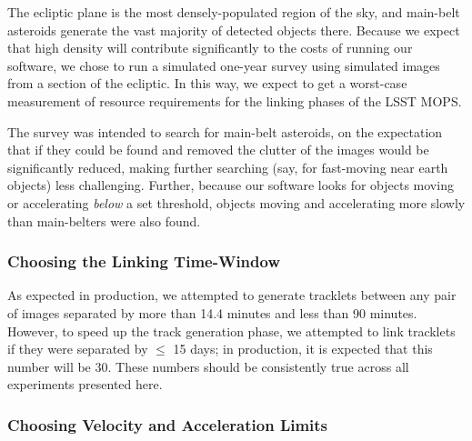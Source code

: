 \documentclass[12pt,preprint]{aastex}
\begin{document}
The ecliptic plane is the most densely-populated region of the sky,
and main-belt asteroids generate the vast majority of detected objects
there.  Because we expect that high density will contribute
significantly to the costs of running our software, we chose to run a
simulated one-year survey using simulated images from a section of the ecliptic.
In this way, we expect to get a worst-case measurement of resource
requirements for the linking phases of the LSST MOPS.

The survey was intended to search for main-belt asteroids, on the
expectation that if they could be found and removed the clutter of the
images would be significantly reduced, making further searching (say,
for fast-moving near earth objects) less challenging.  Further,
because our software looks for objects moving or accelerating
\textit{below} a set threshold, objects moving and accelerating more
slowly than main-belters were also found.

\subsubsection{Choosing the Linking Time-Window}

As expected in production, we attempted to generate tracklets between
any pair of images separated by more than 14.4 minutes and less than
90 minutes.  However, to speed up the track generation phase, we
attempted to link tracklets if they were separated by $\leq$ 15 days;
in production, it is expected that this number will be 30.  These
numbers should be consistently true across all experiments presented
here.


\subsubsection{Choosing Velocity and Acceleration Limits}
\end{document}
